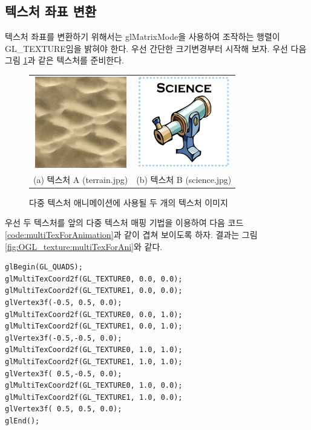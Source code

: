 \subsection{텍스처 좌표 변환}
텍스처 좌표를 변환하기 위해서는 {\sf glMatrixMode}을 사용하여 조작하는 행렬이 {\sf GL\_TEXTURE}임을 밝혀야 한다. 
우선 간단한 크기변경부터 시작해 보자. 우선 다음 그림 \ref{fig:OGL_texture:multiTex3}과 같은 텍스처를 준비한다.

\begin{figure}[h!]
  \centering
	\begin{tabular}{cc}
	\includegraphics[height=4cm]{OGL_texture/terrain.png} &
	\includegraphics[height=4cm]{OGL_texture/science.png}  \\
	{\sf \small (a) 텍스처 A (terrain.jpg)} & {\sf \small (b) 텍스처 B (science.jpg)}
	\end{tabular}
    \caption{다중 텍스처 애니메이션에 사용될 두 개의 텍스처 이미지}
    \label{fig:OGL_texture:multiTex3}
\end{figure}

우선 두 텍스처를 앞의 다중 텍스처 매핑 기법을 이용하여 다음 코드 \ref{code:multiTexForAnimation}과 같이 겹쳐 보이도록 하자.
결과는 그림 \ref{fig:OGL_texture:multiTexForAni}와 같다.

\begin{algorithmbis}\label{code:multiTexForAnimation}
\lstset{language=C++} 
\begin{lstlisting}
glBegin(GL_QUADS);
glMultiTexCoord2f(GL_TEXTURE0, 0.0, 0.0);
glMultiTexCoord2f(GL_TEXTURE1, 0.0, 0.0);
glVertex3f(-0.5, 0.5, 0.0);
glMultiTexCoord2f(GL_TEXTURE0, 0.0, 1.0);
glMultiTexCoord2f(GL_TEXTURE1, 0.0, 1.0);
glVertex3f(-0.5,-0.5, 0.0);
glMultiTexCoord2f(GL_TEXTURE0, 1.0, 1.0);
glMultiTexCoord2f(GL_TEXTURE1, 1.0, 1.0);
glVertex3f( 0.5,-0.5, 0.0);
glMultiTexCoord2f(GL_TEXTURE0, 1.0, 0.0);
glMultiTexCoord2f(GL_TEXTURE1, 1.0, 0.0);
glVertex3f( 0.5, 0.5, 0.0);
glEnd();
\end{lstlisting}
\end{algorithmbis}

